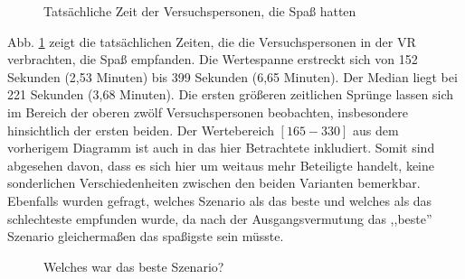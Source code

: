 \documentclass{Paper}
\begin{document}
                \begin{figure}[H]
  \caption{Tatsächliche Zeit der Versuchspersonen, die Spaß hatten}
  \label{ZeitSpass}
        \end{figure}
        Abb. \ref{ZeitSpass} zeigt die tatsächlichen Zeiten, die die Versuchspersonen in der VR verbrachten, die Spaß empfanden. Die Wertespanne erstreckt sich von 152 Sekunden (2,53 Minuten) bis 399 Sekunden (6,65 Minuten). Der Median liegt bei 221 Sekunden (3,68 Minuten). Die ersten größeren zeitlichen Sprünge lassen sich im Bereich der oberen zwölf Versuchspersonen beobachten, insbesondere hinsichtlich der ersten beiden. Der Wertebereich $[165-330]$ aus dem vorherigem Diagramm ist auch in das hier Betrachtete inkludiert. Somit sind abgesehen davon, dass es sich hier um weitaus mehr Beteiligte handelt, keine sonderlichen Verschiedenheiten zwischen den beiden Varianten bemerkbar.\\
        Ebenfalls wurden gefragt, welches Szenario als das beste und welches als das schlechteste empfunden wurde, da nach der Ausgangsvermutung das ,,beste'' Szenario gleichermaßen das spaßigste sein müsste. 


        \begin{figure}[ht]
\caption{Welches war das beste Szenario?}
\label{SzenarioGut}
\end{figure}
\end{document}
